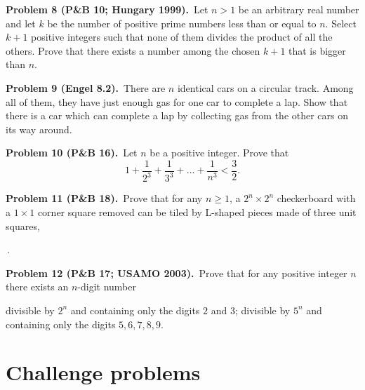 \documentclass[10pt]{scrartcl}
\newcommand{\PacketInkPath}[2][]{\InkStroke[#1]{#2}}
\begin{document}
\begin{prob}\textbf{Problem 8 (P\&B 10; Hungary 1999).}\ Let $n > 1$ be an arbitrary real number and let $k$ be the number of positive prime numbers less than or equal to $n$. Select $k + 1$ positive integers such that none of them divides the product of all the others. Prove that there exists a number among the chosen $k + 1$ that is bigger than $n$.\end{prob}

\begin{prob}\textbf{Problem 9 (Engel 8.2).}\ There are $n$ identical cars on a circular track. Among all of them, they have just enough gas for one car to complete a lap. Show that there is a car which can complete a lap by collecting gas from the other cars on its way around.\end{prob}

\begin{prob}\textbf{Problem 10 (P\&B 16).}\ Let $n$ be a positive integer. Prove that
\[ 1 + \frac{1}{2^3} + \frac{1}{3^3} + \dots + \frac{1}{n^3} < \frac32. \]\end{prob}

\begin{prob}\textbf{Problem 11 (P\&B 18).}\ Prove that for any $n \geq 1$, a $2^n \times 2^n$ checkerboard with a $1 \times 1$ corner square removed can be tiled by L-shaped pieces made of three unit squares,
\,.\end{prob}

\begin{prob}\textbf{Problem 12 (P\&B 17; USAMO 2003).}\ Prove that for any positive integer $n$ there exists an $n$-digit number
\begin{enumerate}[label=(\alph*)]
  \ii divisible by $2^n$ and containing only the digits $2$ and $3$;
  \ii divisible by $5^n$ and containing only the digits $5, 6, 7, 8, 9$.
\end{enumerate}\end{prob}

\section*{Challenge problems}
\end{document}
